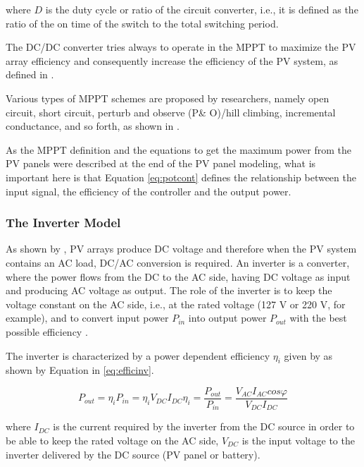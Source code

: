 \noindent where $D$ is the duty cycle or ratio of the circuit converter, i.e., it is defined as the ratio of the on time of the switch to the total switching period.
 
The DC/DC converter tries always to operate in the MPPT to maximize the PV array efficiency and consequently increase the efficiency of the PV system, as defined in \cite{Yatimi}.
  
Various types of MPPT schemes are proposed by researchers, namely open circuit, short circuit, perturb and observe (P\& O)/hill climbing, incremental conductance, and so forth, as shown in  \cite{Haque}.
 
As the MPPT definition and the equations to get the maximum power from the PV panels were described at the end of the PV panel modeling, what is important here is that Equation \ref{eq:potcont} defines the relationship between the input signal, the efficiency of the controller and the output power.
 
\subsubsection{The Inverter Model}
As shown by \cite{Mellit}, PV arrays produce DC voltage and therefore when the PV system contains an AC load, DC/AC conversion is required. An inverter is a converter, where the power flows from the DC to the AC side, having DC voltage as input and producing AC voltage as output. The role of the inverter is to keep the voltage constant on the AC side, i.e., at the rated voltage (127 V or 220 V, for example), and to convert input power $ P_{in} $ into  output power $ P_{out} $ with the best possible efficiency \cite{Hansen}.

The inverter is characterized by a power dependent efficiency $ \eta_{i} $ given by \cite{Hansen} as shown by Equation in  \ref{eq:efficinv}.

\begin{equation}
\label{eq:efficinv}
P_{out} = \eta_{i} P_{in} = \eta_{i} V_{DC} I_{DC}
\eta_{i} = \dfrac{P_{out}}{P_{in}} = \dfrac{V_{AC} I_{AC} cos\varphi}{V_{DC}I_{DC}}
\end{equation}

\noindent where $ I_{DC} $ is the current required by the inverter from the DC source in order to be able to keep the rated voltage on the AC side, $ V_{DC} $ is the input voltage to the inverter delivered by the DC source (PV panel or battery). %

